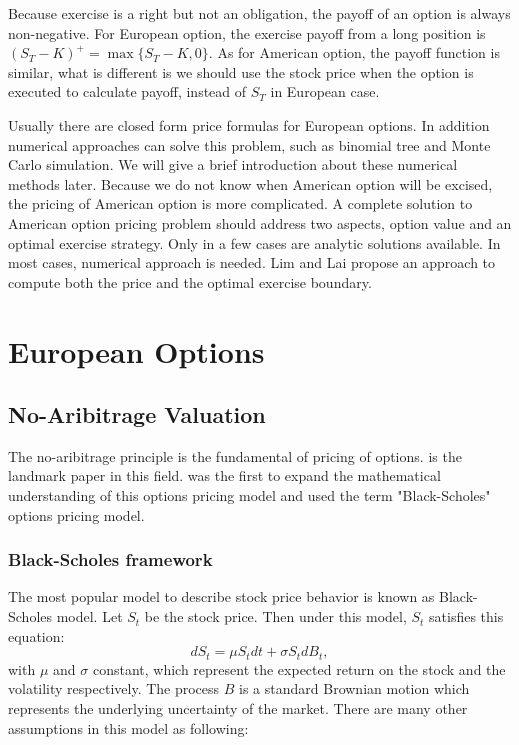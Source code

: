 \documentclass[11pt]{book}
\begin{document}
Because exercise is a right but not an obligation, the payoff of an option is always non-negative. For European option, the exercise payoff from a long position is $(S_T - K)^+ = \max \{S_T-K,0\}$. As for American option, the payoff function is similar, what is different is we should use the stock price when the option is executed to calculate payoff, instead of $S_T$ in European case.



Usually there are closed form price formulas for European options. In addition numerical approaches can solve this problem, such as binomial tree and Monte Carlo simulation. We will give a brief introduction about these numerical methods later. Because we do not know when American option will be excised, the pricing of American option is more complicated. A complete solution to American option pricing problem should address two aspects, option value and an optimal exercise strategy. Only in a few cases are analytic solutions available. In most cases, numerical approach is needed. Lim and Lai \cite{Lim2004} propose an approach to compute both the price and the optimal exercise boundary.


\section{European Options}
\subsection{No-Aribitrage Valuation}

The no-aribitrage principle is the fundamental of pricing of options. \citet*{Black:1973} is the landmark paper in this field. \citet*{merton1973} was the first to expand the mathematical understanding of this options pricing model and used the term "Black-Scholes" options pricing model.

\subsubsection{Black-Scholes framework}
The most popular model to describe stock price behavior is known as Black-Scholes model.
Let $S_t$ be the stock price. Then under this model, $S_t$ satisfies this equation:
\begin{equation}\label{eq:1}
dS_t = \mu S_tdt + \sigma S_tdB_t,
\end{equation}
with $\mu$ and $\sigma $ constant,  which represent the expected return on the stock and the volatility respectively. The process $B$ is a standard Brownian motion which represents the underlying uncertainty of the market. There are many other assumptions in this model as following:
\end{document}
